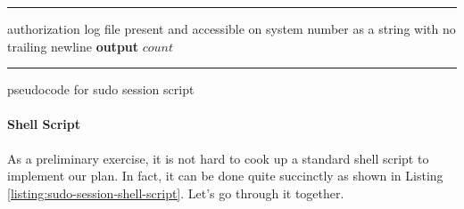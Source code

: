 \documentclass{article}
\begin{document}
\begin{listing}[h]
\hrule \vspace{1em}
\begin{algorithmic}[1]
\Require authorization log file present and accessible on system
\Ensure number as a string with no trailing newline
	\EndIf
\EndFor
\State \textbf{output} $count$
\end{algorithmic}
\vspace{1em} \hrule
\caption{pseudocode for sudo session script}
\label{listing:sudo-session-pseudocode}
\end{listing}

\paragraph{Shell Script}

As a preliminary exercise, it is not hard to cook up a standard shell script to
implement our plan.  In fact, it can be done quite succinctly as shown in
Listing \ref{listing:sudo-session-shell-script}. Let's go through it together.
\end{document}
